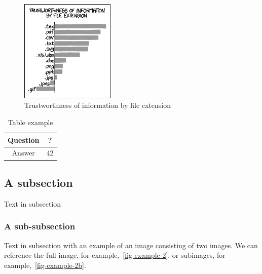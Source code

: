 \documentclass[intlimits,twoside,a4paper,11pt]{article}
\begin{document}
\begin{figure}[htb]
\centering
\includegraphics[width=0.4\textwidth]{xkcd1301.png}
\caption{Trustworthness of information by file extension} \label{fig-example}
\end{figure}

\begin{table}[H]
\centering
\caption{Table example}
\label{table-example}
\begin{tabular}{|c|c|}
	\hline
	Question & ? \\
	\hline
	Answer & 42 \\
	\hline
\end{tabular}
\end{table}

\subsection{A subsection}
Text in subsection
\subsubsection{A sub-subsection}
Text in subsection with an example of an image consisting of two images. We can reference the full image, for example,~\ref{fig-example-2}, or subimages, for example,~\ref{fig-example-2b}.
\end{document}
